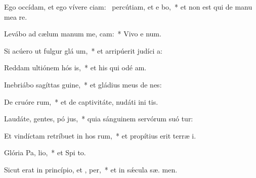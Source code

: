 \item Ego occídam, et ego vívere ciam:~\pscross{} percútiam, et e bo,~* et non est qui de manu mea  re.
\item Levábo ad cælum manum me,  cam:~* Vivo e  num.
\item Si acúero ut fulgur glá um,~* et arripúerit judíci  a:
\item Reddam ultiónem hós is,~* et his qui odé  am.
\item Inebriábo sagíttas  guine,~* et gládius meus de nes:
\item De cruóre rum,~* et de captivitáte, nudáti ini tis.
\item Laudáte, gentes, pó jus,~* quia sánguinem servórum suó tur:
\item Et vindíctam retríbuet in hos rum,~* et propítius erit terræ  i.
\item \singlecolsep
\item Glória Pa,  lio,~* et Spi to.
\item Sicut erat in princípio, et ,  per,~* et in sǽcula sæ. men.

